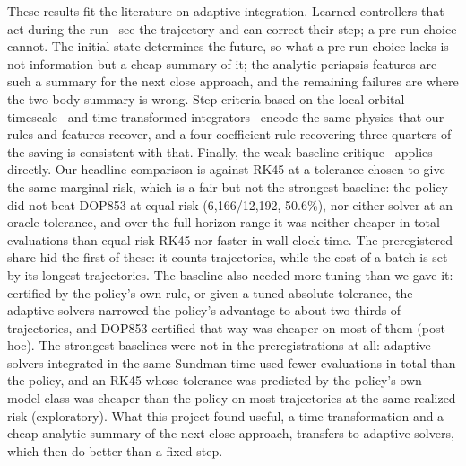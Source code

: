 \documentclass[10pt,letterpaper]{article}
\begin{document}
These results fit the literature on adaptive integration. Learned controllers that act during the run~\cite{dellnitz2023,sazulibarrena2025} see the trajectory and can correct their step; a pre-run choice cannot. The initial state determines the future, so what a pre-run choice lacks is not information but a cheap summary of it; the analytic periapsis features are such a summary for the next close approach, and the remaining failures are where the two-body summary is wrong. Step criteria based on the local orbital timescale~\cite{pham2024} and time-transformed integrators~\cite{mikkola1999,preto1999,wang2020} encode the same physics that our rules and features recover, and a four-coefficient rule recovering three quarters of the saving is consistent with that. Finally, the weak-baseline critique~\cite{mcgreivy2024} applies directly. Our headline comparison is against RK45 at a tolerance chosen to give the same marginal risk, which is a fair but not the strongest baseline: the policy did not beat DOP853 at equal risk (6,166/12,192, 50.6\%), nor either solver at an oracle tolerance, and over the full horizon range it was neither cheaper in total evaluations than equal-risk RK45 nor faster in wall-clock time. The preregistered share hid the first of these: it counts trajectories, while the cost of a batch is set by its longest trajectories. The baseline also needed more tuning than we gave it: certified by the policy's own rule, or given a tuned absolute tolerance, the adaptive solvers narrowed the policy's advantage to about two thirds of trajectories, and DOP853 certified that way was cheaper on most of them (post hoc). The strongest baselines were not in the preregistrations at all: adaptive solvers integrated in the same Sundman time used fewer evaluations in total than the policy, and an RK45 whose tolerance was predicted by the policy's own model class was cheaper than the policy on most trajectories at the same realized risk (exploratory). What this project found useful, a time transformation and a cheap analytic summary of the next close approach, transfers to adaptive solvers, which then do better than a fixed step.
\end{document}
